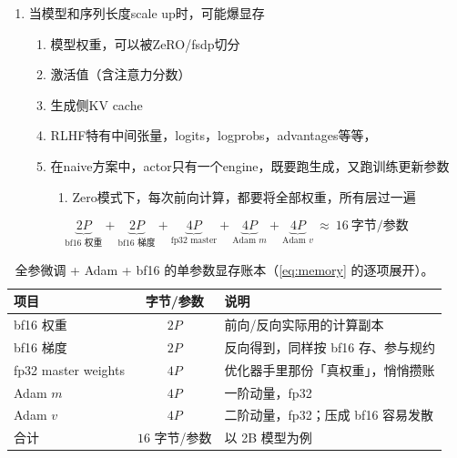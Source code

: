 \documentclass[UTF8,fontset=fandol]{ctexart}
\begin{document}
\begin{enumerate}
  \item 当模型和序列长度scale up时，可能爆显存
  \begin{enumerate}
    \item 模型权重，可以被ZeRO/fsdp切分
    \item 激活值（含注意力分数）                              %
    \item 生成侧KV cache                                       %
    \item RLHF特有中间张量，logits，logprobs，advantages等等，
    \item 在naive方案中，actor只有一个engine，既要跑生成，又跑训练更新参数
    \begin{enumerate}
      \item Zero模式下，每次前向计算，都要将全部权重，所有层过一遍
    \end{enumerate}
  \end{enumerate}
\end{enumerate}

\begin{equation}\label{eq:memory}
  \underbrace{2P}_{\text{bf16 权重}}+\underbrace{2P}_{\text{bf16 梯度}}
  +\underbrace{4P}_{\text{fp32 master}}+\underbrace{4P}_{\text{Adam }m}
  +\underbrace{4P}_{\text{Adam }v}\ \approx\ 16\ \text{字节/参数}
\end{equation}

\begin{table}[htbp]
  \centering
  \caption{全参微调 + Adam + bf16 的单参数显存账本（\cref{eq:memory} 的逐项展开）。}
  \label{tab:memory}
  \begin{tabular}{lcl}
    \toprule
    项目 & 字节/参数 & 说明 \\
    \midrule
    bf16 权重           & $2P$ & 前向/反向实际用的计算副本 \\
    bf16 梯度           & $2P$ & 反向得到，同样按 bf16 存、参与规约 \\
    fp32 master weights & $4P$ & 优化器手里那份「真权重」，悄悄攒账 \\
    Adam $m$            & $4P$ & 一阶动量，fp32 \\
    Adam $v$            & $4P$ & 二阶动量，fp32；压成 bf16 容易发散 \\
    \midrule
    合计                & $16$ 字节/参数 & 以 2B 模型为例 \\
    \bottomrule
  \end{tabular}
\end{table}
\end{document}
